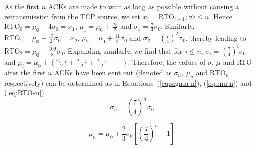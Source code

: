 \documentclass[conference]{IEEEtran}
\begin{document}
As the first $n$ ACKs are made to wait as long as possible without causing a retransmission from the TCP source, we set $x_i = \text{RTO}_{i-1}; \forall i\leq n$. Hence $\text{RTO}_0 = \mu_0 + 4 \sigma_0 = x_1$, $\mu_1 = \mu_0 + \frac{\sigma_0}{2}$ and $\sigma_1 = \frac{7}{4}\sigma_0$. Similarly, $\text{RTO}_1 = \mu_0 + \frac{15}{2} \sigma_0 = x_2$, $\mu_2 = \mu_0 + \frac{11}{8}\sigma_0$ and $\sigma_2 = \left(\frac{7}{4}\right)^2 \sigma_0$, thereby leading to $\text{RTO}_2 = \mu_0 + \frac{109}{8} \sigma_0$. Expanding similarly, we find that for $i \leq n$, $\sigma_i = \left(\frac{7}{4}\right)^i \sigma_0$ and $\mu_i = \mu_0 + \left(\frac{\sigma_{i-1}}{2} + \frac{\sigma_{i-2}}{2} + \frac{\sigma_{i-3}}{2} + \cdots\right)$. Therefore, the values of $\sigma$, $\mu$ and RTO after the first $n$ ACKs have been sent out (denoted as $\sigma_n$, $\mu_n$ and $\text{RTO}_n$ respectively) can be determined as in Equations~(\ref{eq:sigma-n}), (\ref{eq:mu-n}) and (\ref{eq:RTO-n}). 
\begin{equation}
  \label{eq:sigma-n}
  \sigma_n = \left(\frac{7}{4}\right)^n \sigma_0
\end{equation}

\begin{equation}
  \label{eq:mu-n}
  \mu_n = \mu_0 + \frac{2}{3} \sigma_0 \left[ \left(\frac{7}{4}\right)^n - 1\right]
\end{equation}
\end{document}
